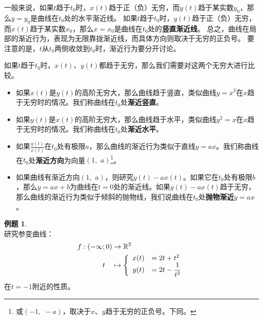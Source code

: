 \documentclass[12pt,UTF8]{ctexbook}
\theoremstyle{definition}
\newtheorem{et}{例题}[section]
\theoremstyle{plain}
\begin{document}
一般来说，如果$t$趋于$t_0$时，$x(t)$趋于正（负）无穷，而$y(t)$趋于某实数$y_0$，那么$y = y_0$是曲线在$t_0$处的水平渐近线。
如果$t$趋于$t_0$时，$y(t)$趋于正（负）无穷，而$x(t)$趋于某实数$x_0$，那么$x = x_0$是曲线在$t_0$处的\textbf{竖直渐近线}。
总之，曲线在局部的渐近行为，表现为无限靠拢渐近线，而具体方向则取决于无穷的正负号。
要注意的是，$t$从$t_0$两侧收敛到$t_0$时，渐近行为要分开讨论。

如果$t$趋于$t_0$时，$x(t)$、$y(t)$都趋于无穷，那么我们需要对这两个无穷大进行比较。
\begin{itemize}
    \item 如果$x(t)$是$y(t)$的高阶无穷大，那么曲线趋于竖直，类似曲线$y = x^2$在$x$趋于无穷时的情况。我们称曲线在$t_0$处\textbf{渐近竖直}。
    \item 如果$y(t)$是$x(t)$的高阶无穷大，那么曲线趋于水平，类似曲线$y^2 = x$在$x$趋于无穷时的情况。我们称曲线在$t_0$处\textbf{渐近水平}。
    \item 如果$\frac{y(t)}{x(t)}$在$t_0$处有极限$a$，那么曲线的渐近行为类似于直线$y = ax$。我们称曲线在$t_0$处\textbf{渐近方向}为向量$(1,\,\,a)$\footnote{或$(-1,\,\,-a)$，取决于$x$、$y$趋于无穷的正负号。下同。}。
    \item 如果曲线有渐近方向$(1, \,\,a)$，则研究$y(t) - ax(t)$。如果它在$t_0$处有极限$b$，那么$y = ax + b$为曲线在$t=0$处的渐近线。如果$y(t) - ax(t)$趋于无穷，那么曲线的渐近行为类似于倾斜的抛物线，我们说曲线在$t_0$处\textbf{抛物渐近}$y = ax$。
\end{itemize}

\begin{et}
    \mbox{} \\
    研究参变曲线：%
    \begin{align*}
        f: (-\infty;0) &\rightarrow \mathbb{R}^2 \\
        t\quad &\mapsto\left\{
            \begin{array}[]{rl}
                x(t) &=2t + t^2 \\
                y(t) &\displaystyle = 2t - \frac{1}{t^2}\\
            \end{array}
        \right.
    \end{align*}
    在$t=-1$附近的性质。
\end{et}
\end{document}
